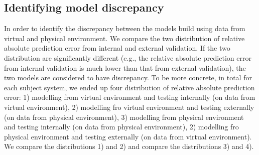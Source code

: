 \subsection{Identifying model discrepancy}
In order to identify the discrepancy between the models build using data from virtual and physical environment. We compare the two distribution of relative absolute prediction error from internal and external validation. If the two distribution are significantly different (e.g., the relative absolute prediction error from internal validation is much lower than that from external validation), the two models are considered to have discrepancy. To be more concrete, in total for each subject system, we ended up four distribution of relative absolute prediction error: 1) modelling from virtual environment and testing internally (on data from virtual environment), 2) modelling fro virtual environment and testing externally (on data from physical environment), 3) modelling from physical environment and testing internally (on data from physical environment), 2) modelling fro physical environment and testing externally (on data from virtual environment). We compare the distributions 1) and 2) and compare the distributions 3) and 4).







	
	
	
